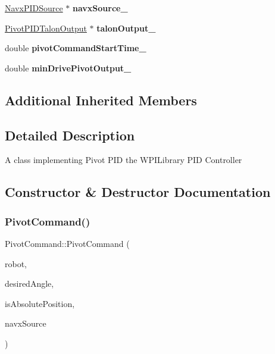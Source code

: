 \begin{DoxyCompactItemize}
\mbox{\label{class_pivot_command_a5fd31234c07b80cc3ffddb3ce28bc49b}} 
\hyperlink{class_navx_p_i_d_source}{Navx\+P\+I\+D\+Source} $\ast$ {\bfseries navx\+Source\+\_\+}
\item 
\mbox{\label{class_pivot_command_a590ea9a551076484febed96b6f7d9a64}} 
\hyperlink{class_pivot_p_i_d_talon_output}{Pivot\+P\+I\+D\+Talon\+Output} $\ast$ {\bfseries talon\+Output\+\_\+}
\item 
\mbox{\label{class_pivot_command_a5ec7f0d7b577e7830251e78a895798b5}} 
double {\bfseries pivot\+Command\+Start\+Time\+\_\+}
\item 
\mbox{\label{class_pivot_command_aa0b7e3b621788df09e8f2cc3c184b858}} 
double {\bfseries min\+Drive\+Pivot\+Output\+\_\+}
\end{DoxyCompactItemize}
\subsection*{Additional Inherited Members}


\subsection{Detailed Description}
A class implementing Pivot P\+ID the W\+P\+I\+Library P\+ID Controller 

\subsection{Constructor \& Destructor Documentation}
\mbox{\label{class_pivot_command_aeed6d5f91fade3124c4a66080edad50d}} 
\subsubsection{\texorpdfstring{Pivot\+Command()}{PivotCommand()}}
{\footnotesize\ttfamily Pivot\+Command\+::\+Pivot\+Command (\begin{DoxyParamCaption}\item[{\hyperlink{class_robot_model}{Robot\+Model} $\ast$}]{robot,  }\item[{double}]{desired\+Angle,  }\item[{bool}]{is\+Absolute\+Position,  }\item[{\hyperlink{class_navx_p_i_d_source}{Navx\+P\+I\+D\+Source} $\ast$}]{navx\+Source }\end{DoxyParamCaption})}

